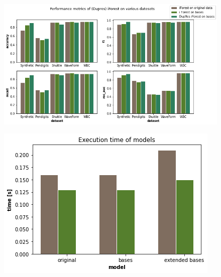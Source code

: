 




\begin{figure}
  \centering
  \includegraphics[width=\linewidth]{images/performance_metrics.png}
  \caption{}
  \label{fig:performance_metrics}
\end{figure}

\begin{figure}
  \centering
  \includegraphics[width=0.8\linewidth]{images/performance_time.png}
  \caption{}
  \label{fig:performance_time}
\end{figure}

